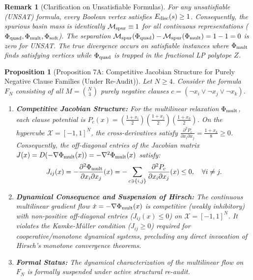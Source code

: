 \documentclass[11pt,a4paper]{article}
\newtheorem{proposition}[theorem]{Proposition}
\newtheorem{remark}[theorem]{Remark}
\begin{document}
\begin{remark}[Clarification on Unsatisfiable Formulas]
For any unsatisfiable (UNSAT) formula, every Boolean vertex satisfies $E_{\rm disc}(s) \ge 1$. Consequently, the spurious basin mass is identically $\mathcal{M}_{\rm spur} \equiv 1$ for all continuous representations ($\Phi_{\rm quad}, \Phi_{\rm mult}, \Phi_{\rm soft}$). The separation $\mathcal{M}_{\rm spur}(\Phi_{\rm quad}) - \mathcal{M}_{\rm spur}(\Phi_{\rm mult}) = 1 - 1 = 0$ is zero for UNSAT. The true divergence occurs on satisfiable instances where $\Phi_{\rm mult}$ finds satisfying vertices while $\Phi_{\rm quad}$ is trapped in the fractional LP polytope $Z$.
\end{remark}

\begin{proposition}[Proposition 7A: Competitive Jacobian Structure for Purely Negative Clause Families (Under Re-Audit)]
\label{prop:constructive_basin}
Let $N \ge 4$. Consider the formula $F_N$ consisting of all $M = \binom{N}{3}$ purely negative clauses $c = (\neg x_i \lor \neg x_j \lor \neg x_k)$.
\begin{enumerate}
    \item \textbf{Competitive Jacobian Structure:} For the multilinear relaxation $\Phi_{\rm mult}$, each clause potential is $P_c(x) = \left(\frac{1+x_i}{2}\right)\left(\frac{1+x_j}{2}\right)\left(\frac{1+x_k}{2}\right)$. On the hypercube $\mathcal{X} = [-1, 1]^N$, the cross-derivatives satisfy $\frac{\partial^2 P_c}{\partial x_i \partial x_j} = \frac{1+x_k}{8} \ge 0$. Consequently, the off-diagonal entries of the Jacobian matrix $J(x) = D(-\nabla \Phi_{\rm mult}(x)) = -\nabla^2 \Phi_{\rm mult}(x)$ satisfy:
    \begin{equation}
    J_{ij}(x) = -\frac{\partial^2 \Phi_{\rm mult}}{\partial x_i \partial x_j}(x) = -\sum_{c \ni \{i, j\}} \frac{\partial^2 P_c}{\partial x_i \partial x_j}(x) \le 0, \quad \forall i \ne j.
    \end{equation}
    \item \textbf{Dynamical Consequence and Suspension of Hirsch:} The continuous multilinear gradient flow $\dot{x} = -\nabla \Phi_{\rm mult}(x)$ is competitive (weakly inhibitory) with non-positive off-diagonal entries ($J_{ij}(x) \le 0$) on $\mathcal{X} = [-1, 1]^N$. It violates the Kamke-M\"uller condition ($J_{ij} \ge 0$) required for cooperative/monotone dynamical systems, precluding any direct invocation of Hirsch's monotone convergence theorems.
    \item \textbf{Formal Status:} The dynamical characterization of the multilinear flow on $F_N$ is formally suspended under active structural re-audit.
\end{enumerate}
\end{proposition}
\end{document}
